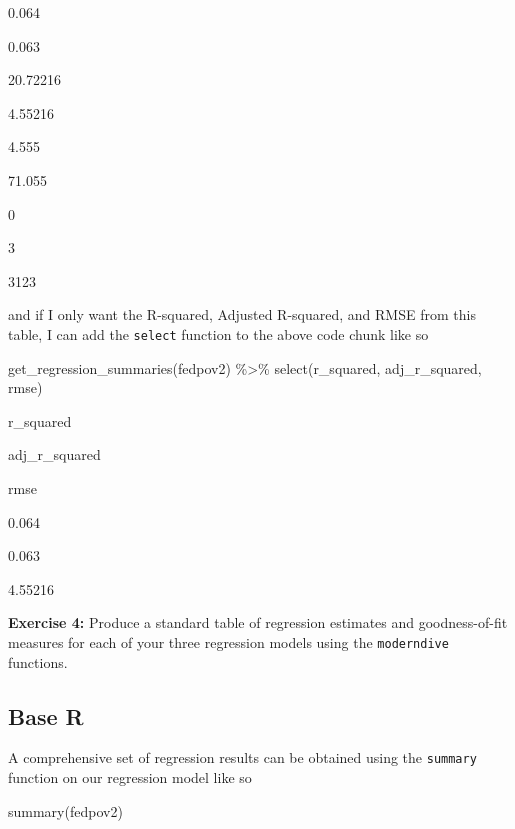 \documentclass[
]{book}
\makeatletter
\newenvironment{Shaded}{\begin{snugshade}}{\end{snugshade}}
\newcommand{\FunctionTok}[1]{\textcolor[rgb]{0,0,0}{#1}}
\newcommand{\NormalTok}[1]{#1}
\newcommand{\SpecialCharTok}[1]{\textcolor[rgb]{0,0,0}{#1}}
\newenvironment{kframe}{%
\medskip{}
\setlength{\fboxsep}{.8em}
 \def\at@end@of@kframe{}%
 \ifinner\ifhmode%
  \def\at@end@of@kframe{\end{minipage}}%
  \begin{minipage}{\columnwidth}%
 \fi\fi%
 \def\FrameCommand##1{\hskip\@totalleftmargin \hskip-\fboxsep
 \colorbox{shadecolor}{##1}\hskip-\fboxsep
     \hskip-\linewidth \hskip-\@totalleftmargin \hskip\columnwidth}%
 \MakeFramed {\advance\hsize-\width
   \@totalleftmargin\z@ \linewidth\hsize
   \@setminipage}}%
 {\par\unskip\endMakeFramed%
 \at@end@of@kframe}
\renewenvironment{Shaded}{\begin{kframe}}{\end{kframe}}
\newenvironment{rmdblock}[1]
  {\begin{shaded*}
  }
  {\end{shaded*}
  }
\newenvironment{learncheck}
  {\begin{rmdblock}{warning}}
  {\end{rmdblock}}
\makeatother
\begin{document}
0.064

0.063

20.72216

4.55216

4.555

71.055

0

3

3123

and if I only want the R-squared, Adjusted R-squared, and RMSE from this table, I can add the \texttt{select} function to the above code chunk like so

\begin{Shaded}
\begin{Highlighting}[]
\FunctionTok{get\_regression\_summaries}\NormalTok{(fedpov2) }\SpecialCharTok{\%\textgreater{}\%} 
  \FunctionTok{select}\NormalTok{(r\_squared, adj\_r\_squared, rmse)}
\end{Highlighting}
\end{Shaded}

r\_squared

adj\_r\_squared

rmse

0.064

0.063

4.55216

\begin{learncheck}
\textbf{Exercise 4:} Produce a standard table of regression estimates
and goodness-of-fit measures for each of your three regression models
using the \texttt{moderndive} functions.
\end{learncheck}

\hypertarget{base-r}{%
\subsection{Base R}\label{base-r}}

A comprehensive set of regression results can be obtained using the \texttt{summary} function on our regression model like so

\begin{Shaded}
\begin{Highlighting}[]
\FunctionTok{summary}\NormalTok{(fedpov2)}
\end{Highlighting}
\end{Shaded}
\end{document}
